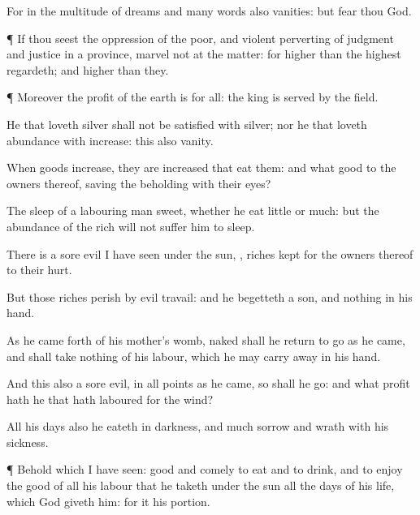 {For in the
multitude of
dreams and
many
words
{} also
{}
vanities: but
fear thou
God.


\par }{\PP {}¶ If thou
seest the
oppression of the
poor, and
violent perverting of
judgment and
justice in a
province,
marvel not at the
matter: for
{}
higher than the
highest
regardeth; and
{}
higher than
they.


\par }{\PP {}¶ Moreover the
profit of the
earth is for all: the
king
{} is
served by the
field.

He that
loveth
silver shall not be
satisfied with
silver; nor he that
loveth
abundance with
increase: this
{} also
vanity.

When
goods
increase, they are
increased that
eat them: and what
good
{} to the
owners thereof,
saving the
beholding
{} with their
eyes?

The
sleep of a labouring
man
{}
sweet, whether he
eat
little or
much: but the
abundance of the
rich will not
suffer him to
sleep.

There
is a
sore
evil
{} I have
seen under the
sun,
{},
riches
kept for the
owners thereof to their
hurt.

But those
riches
perish by
evil
travail: and he
begetteth a
son, and
{}
nothing in his
hand.

As he came
forth of his
mother’s
womb,
naked shall he
return to
go as he
came, and shall
take
nothing of his
labour, which he may carry
away in his
hand.

And
this also
{} a
sore
evil,
{} in all
points as he
came, so shall he
go: and what
profit hath he that hath
laboured for the
wind?

All his
days also he
eateth in
darkness, and
{}
much
sorrow and
wrath with his
sickness.


\par }{\PP {}¶ Behold
{} which I have
seen:
{}
good and
comely
{} to
eat and to
drink, and to
enjoy the
good of all his
labour that he
taketh under the
sun
all the
days of his
life, which
God
giveth him: for it
{} his
portion.

}
